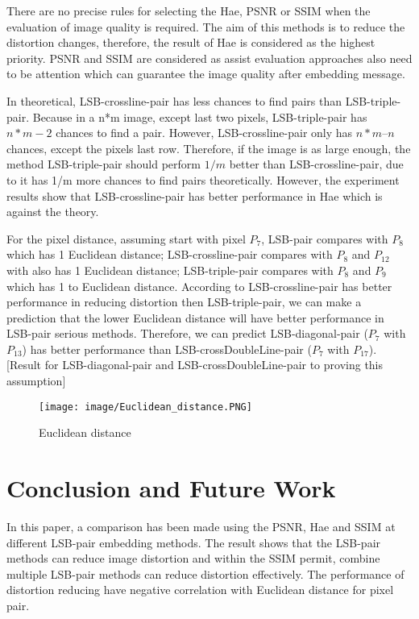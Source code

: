 \documentclass[%
    reprint,
    amsmath,amssymb,
    aps,
   ]{revtex4-1}
\begin{document}
   
   There are no precise rules for selecting the Hae, PSNR or SSIM when the evaluation of image quality is required. The aim of this methods is to reduce the distortion changes, therefore, the result of Hae is considered as the highest priority. PSNR and SSIM are considered as assist evaluation approaches also need to be attention which can guarantee the image quality after embedding message. 
   
   In theoretical, LSB-crossline-pair has less chances to find pairs than LSB-triple-pair. Because in a n*m image, except last two pixels, LSB-triple-pair has \(n*m -2\) chances to find a pair. However, LSB-crossline-pair only has \(n*m – n\) chances, except the pixels last row. Therefore, if the image is as large enough, the method LSB-triple-pair should perform \(1/m\) better than LSB-crossline-pair, due to it has 1/m more chances to find pairs theoretically. However, the experiment results show that LSB-crossline-pair has better performance in Hae which is against the theory. 
   
   For the pixel distance, assuming start with pixel \(P_{7}\), LSB-pair compares with \(P_{8}\) which has 1 Euclidean distance; LSB-crossline-pair compares with \(P_{8}\) and \(P_{12}\) with also has 1 Euclidean distance; LSB-triple-pair compares with \(P_{8}\) and \(P_{9}\) which has 1 to Euclidean distance. According to LSB-crossline-pair has better performance in reducing distortion then LSB-triple-pair, we can make a prediction that the lower Euclidean distance will have better performance in LSB-pair serious methods. Therefore, we can predict LSB-diagonal-pair (\(P_{7}\) with \(P_{13}\)) has better performance than LSB-crossDoubleLine-pair (\(P_{7}\) with \(P_{17}\)).
   [Result for LSB-diagonal-pair and LSB-crossDoubleLine-pair to proving this assumption]
   
   
   \begin{figure}[h]
   \texttt{[image: image/Euclidean\_distance.PNG]}
   \caption{Euclidean distance}
   \label{fig:figure}
   \end{figure} 
   
   
   
   
   
   \section{\label{sec:level1}Conclusion and Future Work}
   
   In this paper, a comparison has been made using the PSNR, Hae and SSIM at different LSB-pair embedding methods. The result shows that the LSB-pair methods can reduce image distortion and within the SSIM permit, combine multiple LSB-pair methods can reduce distortion effectively. The performance of distortion reducing have negative correlation with Euclidean distance for pixel pair.
   
\end{document}

